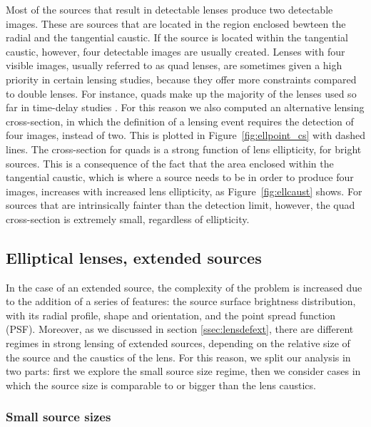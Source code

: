\documentclass{aa}
\def\Fref#1{Figure~\ref{#1}\xspace}
\begin{document}
Most of the sources that result in detectable lenses produce two detectable images. These are sources that are located in the region enclosed bewteen the radial and the tangential caustic. 
If the source is located within the tangential caustic, however, four detectable images are usually created.
Lenses with four visible images, usually referred to as quad lenses, are sometimes given a high priority in certain lensing studies, because they offer more constraints compared to double lenses. For instance, quads make up the majority of the lenses used so far in time-delay studies \citep{Mil++20}.
For this reason we also computed an alternative lensing cross-section, in which the definition of a lensing event requires the detection of four images, instead of two.
This is plotted in \Fref{fig:ellpoint_cs} with dashed lines.
The cross-section for quads is a strong function of lens ellipticity, for bright sources.
This is a consequence of the fact that the area enclosed within the tangential caustic, which is where a source needs to be in order to produce four images, increases with increased lens ellipticity, as \Fref{fig:ellcaust} shows.
For sources that are intrinsically fainter than the detection limit, however, the quad cross-section is extremely small, regardless of ellipticity.


\subsection{Elliptical lenses, extended sources}\label{ssec:ellext}

In the case of an extended source, the complexity of the problem is increased due to the addition of a series of features: the source surface brightness distribution, with its radial profile, shape and orientation, and the point spread function (PSF). 
Moreover, as we discussed in section \ref{ssec:lensdefext}, there are different regimes in strong lensing of extended sources, depending on the relative size of the source and the caustics of the lens.
For this reason, we split our analysis in two parts: first we explore the small source size regime, then we consider cases in which the source size is comparable to or bigger than the lens caustics.

\subsubsection{Small source sizes}
\end{document}
